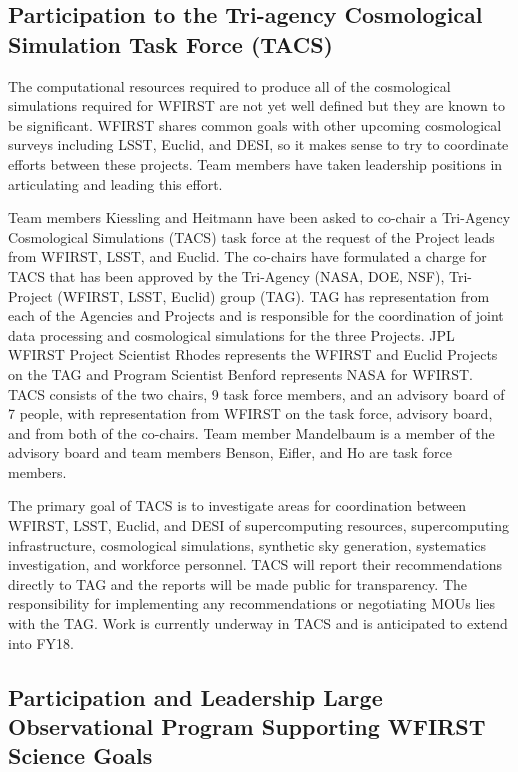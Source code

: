 \subsection{Participation to the Tri-agency  Cosmological Simulation Task Force (TACS)}
\label{sec:tacs}
The computational resources required to produce all of the cosmological simulations required for WFIRST are not yet well defined but they are known to be significant. WFIRST shares common goals with other upcoming cosmological surveys including LSST, Euclid, and DESI, so it makes sense to try to coordinate efforts between these projects. Team members have taken leadership positions in articulating and leading this effort.

Team members Kiessling and Heitmann have been asked to co-chair a Tri-Agency Cosmological Simulations (TACS) task force at the request of the Project leads from WFIRST, LSST, and Euclid. The co-chairs have formulated a charge for TACS that has been approved by the Tri-Agency (NASA, DOE, NSF), Tri-Project (WFIRST, LSST, Euclid) group (TAG). TAG has representation from each of the Agencies and Projects and is responsible for the coordination of joint data processing and cosmological simulations for the three Projects. JPL WFIRST Project Scientist Rhodes represents the WFIRST and Euclid Projects on the TAG and Program Scientist Benford represents NASA for WFIRST. TACS consists of the two chairs, 9 task force members, and an advisory board of 7 people, with representation from WFIRST on the task force, advisory board, and from both of the co-chairs. Team member Mandelbaum is a member of the advisory board and team members Benson, Eifler, and Ho are task force members.

The primary goal of TACS is to investigate areas for coordination between WFIRST, LSST, Euclid, and DESI of supercomputing resources, supercomputing infrastructure, cosmological simulations, synthetic sky generation, systematics investigation, and workforce personnel. TACS will report their recommendations directly to TAG and the reports will be made public for transparency. The responsibility for implementing any recommendations or negotiating MOUs lies with the TAG. Work is currently underway in TACS and is anticipated to extend into FY18.

\subsection{Participation and Leadership Large Observational Program Supporting WFIRST Science Goals}

